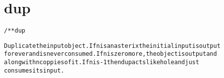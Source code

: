 \section{dup}
\begin{shaded}
\begin{alltt}
/** dup

Duplicate the input object.  If n is an asterix the initial input is output
forever and is never consumed.  If n is zero more, the object is output and
along with n coppies of it.  If n is -1 then dup acts like hole and just
consumes its input.

\end{alltt}
\end{shaded}
